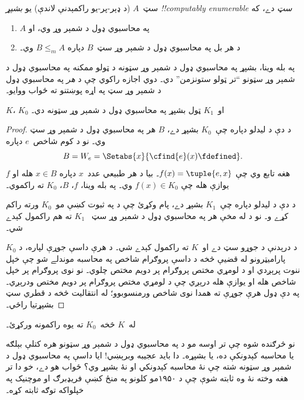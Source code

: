 \documentclass[../../../include/open-logic-section]{subfiles}
\begin{document}

\begin{defn}
سټ~$A$ (د ډېر-پر-يو راکمېدنې لاندې) يو
\emph{بشپړ !!{computably enumerable} سټ} دے، که
\begin{enumerate}
\item $A$ په محاسبوي ډول د شمېر وړ وي، او
\item د هر بل په محاسبوي ډول د شمېر وړ سټ~$B$ دپاره $B \leq_m A$ وي۔
\end{enumerate}
\end{defn}

په بله وينا، بشپړ په محاسبوي ډول د شمېر وړ سټونه د ټولو ممکنه په
محاسبوي ډول د شمېر وړ سټونو ``تر ټولو ستونزمن'' دي۔ دوي اجازه راکوي
چې د \emph{هر} په محاسبوي ډول د شمېر وړ سټ په اړه پوښتنو ته ځواب
ووايو۔

\begin{thm}
$K$، $K_0$ او~$K_1$ ټول بشپړ په محاسبوي ډول د شمېر وړ سټونه دي۔
\end{thm}

\begin{proof}
د دې د ليدلو دپاره چې~$K_0$ بشپړ دے، $B$ هر په محاسبوي ډول د شمېر
وړ سټ وي۔ نو د کوم شاخص~$e$ دپاره
\[
B = W_e = \Setabs{x}{\cfind{e}(x) \fdefined}.
\]
$f$ هغه تابع وي چې $f(x) = \tuple{e, x}$۔ بيا د هر طبيعي عدد~$x$
دپاره $x \in B$ هله او يوازې هله چې $f(x) \in K_0$ وي۔ په بله
وينا، $f$، $B$، $K_0$ ته راکموي۔

د دې د ليدلو دپاره چې~$K_1$ بشپړ دے، پام وکړئ چې د
 په ثبوت کښې مو~$K_0$ ورته راکم کړے و۔ نو د
 له مخې هر په محاسبوي ډول د شمېر وړ سټ
~$K_1$ ته هم راکمول کېدے شي۔

$K_0$ د درېدنې د جوړو سټ دے او~$K$ ته راکمول کېدے شي۔
د هرې داسې جوړې لپاره، د پاراميټرونو له قضيې څخه د داسې
پروګرام شاخص په محاسبه موندلے شو چې خپل ننوت پرېږدي او د
لومړي مختص پروګرام پر دويم مختص چلوي۔ نو نوی پروګرام پر خپل
شاخص هله او يوازې هله درېږي چې د لومړي مختص پروګرام پر دويم
مختص ودرېږي۔ په دې ډول هرې جوړې ته همدا نوی شاخص ورمنسوبوو؛
له انتقاليت څخه د قطري سټ بشپړتيا راځي۔
\end{proof}

\begin{prob}
له~$K$ څخه~$K_0$ ته يوه راکمونه ورکړئ۔
\end{prob}

\begin{digress}
نو څرګنده شوه چې تر اوسه مو د په محاسبوي ډول د شمېر وړ سټونو هره
کتلې بېلګه يا محاسبه کېدونکې ده، يا بشپړه۔ دا بايد عجيبه وبرېښي!{}
ايا داسې په محاسبوي ډول د شمېر وړ سټونه شته چې نۀ محاسبه کېدونکي او
نۀ بشپړ وي؟ ځواب هو دے، خو دا تر هغه وخته نۀ وه ثابته شوې چې د
۱۹۵۰مو کلونو په منځ کښې فريډبرګ او موچنيک په خپلواکه توګه ثابته کړه۔
\end{digress}
\end{document}
